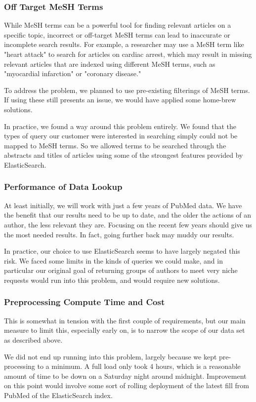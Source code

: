 \subsubsection{Off Target MeSH Terms}
While MeSH terms can be a powerful tool for finding relevant articles on a specific topic, incorrect or off-target MeSH terms can lead to inaccurate or incomplete search results. For example, a researcher may use a MeSH term like "heart attack" to search for articles on cardiac arrest, which may result in missing relevant articles that are indexed using different MeSH terms, such as "myocardial infarction" or "coronary disease."

To address the problem, we planned to use pre-existing filterings of MeSH terms. If using these still presents an issue, we would have applied some home-brew solutions.

In practice, we found a way around this problem entirely. We found that the types of query our customer were interested in searching simply could not be mapped to MeSH terms. So we allowed terms to be searched through the abstracts and titles of articles using some of the strongest features provided by ElasticSearch.

\subsubsection{Performance of Data Lookup}
At least initially, we will work with just a few years of PubMed data. We have the benefit that our results need to be up to date, and the older the actions of an author, the less relevant they are. Focusing on the recent few years should give us the most needed results. In fact, going further back may muddy our results.

In practice, our choice to use ElasticSearch seems to have largely negated this risk. We faced some limits in the kinds of queries we could make, and in particular our original goal of returning groups of authors to meet very niche requests would run into this problem, and would require new solutions.

\subsubsection{Preprocessing Compute Time and Cost}
This is somewhat in tension with the first couple of requirements, but our main measure to limit this, especially early on, is to narrow the scope of our data set as described above.

We did not end up running into this problem, largely because we kept pre-processing to a minimum. A full load only took 4 hours, which is a reasonable amount of time to be down on a Saturday night around midnight. Improvement on this point would involve some sort of rolling deployment of the latest fill from PubMed of the ElasticSearch index.


